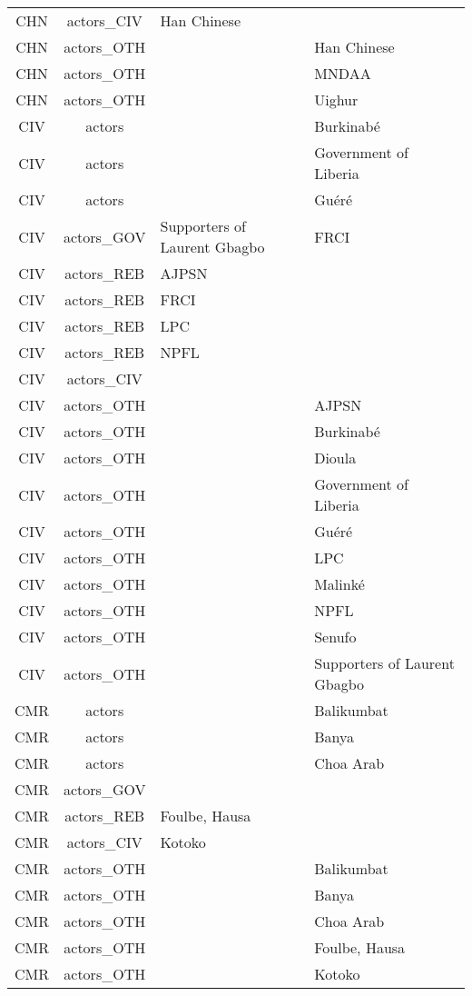 \documentclass[12pt]{article}
\begin{document}
\begin{center}
\begin{longtable}{|c|c|p{7cm}|p{7cm}|}
  CHN & actors\_CIV & Han Chinese &  \\ 
  CHN & actors\_OTH &  & Han Chinese \\ 
  CHN & actors\_OTH &  & MNDAA \\ 
  CHN & actors\_OTH &  & Uighur \\ 
  CIV & actors &  & Burkinabé \\ 
  CIV & actors &  & Government of Liberia \\ 
  CIV & actors &  & Guéré \\ 
  CIV & actors\_GOV & Supporters of Laurent Gbagbo & FRCI \\ 
  CIV & actors\_REB & AJPSN &  \\ 
  CIV & actors\_REB & FRCI &  \\ 
  CIV & actors\_REB & LPC &  \\ 
  CIV & actors\_REB & NPFL &  \\ 
  CIV & actors\_CIV &  &  \\ 
  CIV & actors\_OTH &  & AJPSN \\ 
  CIV & actors\_OTH &  & Burkinabé \\ 
  CIV & actors\_OTH &  & Dioula \\ 
  CIV & actors\_OTH &  & Government of Liberia \\ 
  CIV & actors\_OTH &  & Guéré \\ 
  CIV & actors\_OTH &  & LPC \\ 
  CIV & actors\_OTH &  & Malinké \\ 
  CIV & actors\_OTH &  & NPFL \\ 
  CIV & actors\_OTH &  & Senufo \\ 
  CIV & actors\_OTH &  & Supporters of Laurent Gbagbo \\ 
  CMR & actors &  & Balikumbat \\ 
  CMR & actors &  & Banya \\ 
  CMR & actors &  & Choa Arab \\ 
  CMR & actors\_GOV &  &  \\ 
  CMR & actors\_REB & Foulbe, Hausa &  \\ 
  CMR & actors\_CIV & Kotoko &  \\ 
  CMR & actors\_OTH &  & Balikumbat \\ 
  CMR & actors\_OTH &  & Banya \\ 
  CMR & actors\_OTH &  & Choa Arab \\ 
  CMR & actors\_OTH &  & Foulbe, Hausa \\ 
  CMR & actors\_OTH &  & Kotoko \\ 

\end{longtable}
\end{center}
\end{document}

